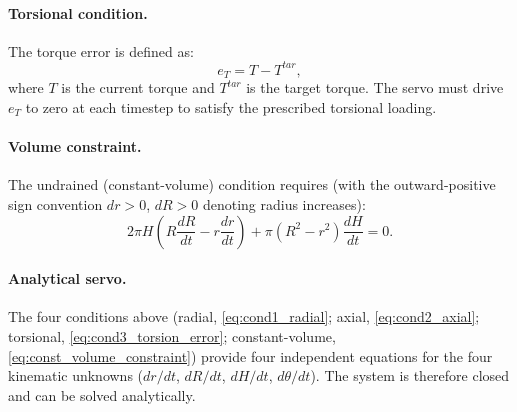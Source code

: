 \documentclass[a4paper,fleqn]{cas-sc}
\begin{document}
\paragraph{Torsional condition.}
The torque error is defined as:
\begin{equation}
e_T = T - T^{tar},
\label{eq:cond3_torsion_error}
\end{equation}
where $T$ is the current torque and $T^{tar}$ is the target torque. The servo must drive $e_T$ to zero at each timestep to satisfy the prescribed torsional loading.

\paragraph{Volume constraint.}
The undrained (constant-volume) condition requires (with the outward-positive sign convention $dr>0$, $dR>0$ denoting radius increases):
\begin{equation}
2\pi H\!\left(R\frac{dR}{dt} - r\frac{dr}{dt}\right) + \pi\!\left(R^2-r^2\right)\frac{dH}{dt} = 0.
\label{eq:const_volume_constraint}
\end{equation}

\paragraph{Analytical servo.}
The four conditions above (radial, \cref{eq:cond1_radial}; axial, \cref{eq:cond2_axial}; torsional, \cref{eq:cond3_torsion_error}; constant-volume, \cref{eq:const_volume_constraint}) provide four independent equations for the four kinematic unknowns ($dr/dt$, $dR/dt$, $dH/dt$, $d\theta/dt$). The system is therefore closed and can be solved analytically.
\end{document}
